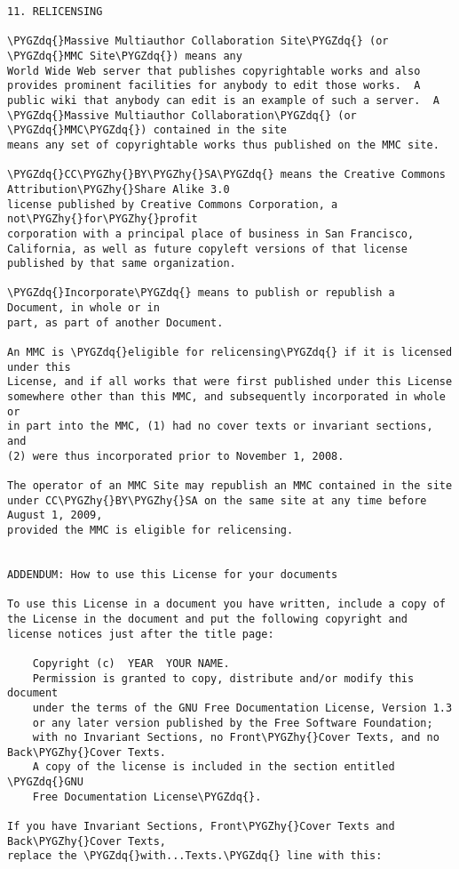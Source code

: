 \documentclass[letterpaper,10pt,english]{sphinxmanual}
\def\PYGZhy{\char`\-}
\def\PYGZdq{\char`\"}
\begin{document}
\begin{Verbatim}[frame=single,commandchars=\\\{\}]
11. RELICENSING

\PYGZdq{}Massive Multiauthor Collaboration Site\PYGZdq{} (or \PYGZdq{}MMC Site\PYGZdq{}) means any
World Wide Web server that publishes copyrightable works and also
provides prominent facilities for anybody to edit those works.  A
public wiki that anybody can edit is an example of such a server.  A
\PYGZdq{}Massive Multiauthor Collaboration\PYGZdq{} (or \PYGZdq{}MMC\PYGZdq{}) contained in the site
means any set of copyrightable works thus published on the MMC site.

\PYGZdq{}CC\PYGZhy{}BY\PYGZhy{}SA\PYGZdq{} means the Creative Commons Attribution\PYGZhy{}Share Alike 3.0 
license published by Creative Commons Corporation, a not\PYGZhy{}for\PYGZhy{}profit 
corporation with a principal place of business in San Francisco, 
California, as well as future copyleft versions of that license 
published by that same organization.

\PYGZdq{}Incorporate\PYGZdq{} means to publish or republish a Document, in whole or in 
part, as part of another Document.

An MMC is \PYGZdq{}eligible for relicensing\PYGZdq{} if it is licensed under this 
License, and if all works that were first published under this License 
somewhere other than this MMC, and subsequently incorporated in whole or 
in part into the MMC, (1) had no cover texts or invariant sections, and 
(2) were thus incorporated prior to November 1, 2008.

The operator of an MMC Site may republish an MMC contained in the site
under CC\PYGZhy{}BY\PYGZhy{}SA on the same site at any time before August 1, 2009,
provided the MMC is eligible for relicensing.


ADDENDUM: How to use this License for your documents

To use this License in a document you have written, include a copy of
the License in the document and put the following copyright and
license notices just after the title page:

    Copyright (c)  YEAR  YOUR NAME.
    Permission is granted to copy, distribute and/or modify this document
    under the terms of the GNU Free Documentation License, Version 1.3
    or any later version published by the Free Software Foundation;
    with no Invariant Sections, no Front\PYGZhy{}Cover Texts, and no Back\PYGZhy{}Cover Texts.
    A copy of the license is included in the section entitled \PYGZdq{}GNU
    Free Documentation License\PYGZdq{}.

If you have Invariant Sections, Front\PYGZhy{}Cover Texts and Back\PYGZhy{}Cover Texts,
replace the \PYGZdq{}with...Texts.\PYGZdq{} line with this:


\end{Verbatim}
\end{document}
